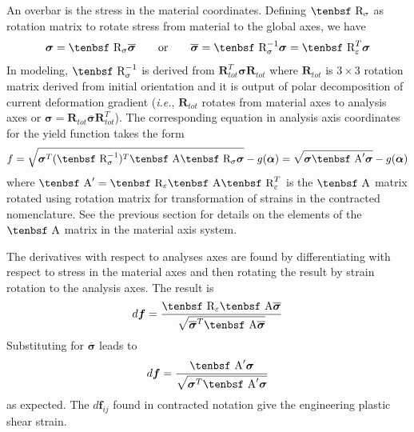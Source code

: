 \documentclass[11pt]{book}
\renewcommand{\vec}[1]{\boldsymbol{#1}}
\def\A{\hbox{\tenbsf A}}
\def\df{d \vec{f}}
\def\R{\hbox{\tenbsf R}}
\begin{document}
An overbar is the stress in the material coordinates. Defining $\R_\sigma$ as rotation matrix to rotate stress from material to the global axes, we have
\begin{equation}
     \vec\sigma = \R_\sigma\overline{\vec\sigma} \qquad{\rm or}\qquad \overline{\vec\sigma} =  \R_\sigma^{-1}\vec\sigma = \R_\varepsilon^T\vec\sigma
\end{equation}
In modeling, $\R_\sigma^{-1}$ is derived from $\vec R_{tot}^T\vec\sigma\vec R_{tot}$ where $\vec R_{tot}$ is $3\times3$ rotation matrix derived from initial orientation and it is output of polar decomposition of current deformation gradient (\emph{i.e.}, $\vec R_{tot}$ rotates from material axes to analysis axes or $\vec\sigma = \vec R_{tot}\overline{\vec\sigma}\vec R_{tot}^T$).
The corresponding equation in analysis axis coordinates for the yield function takes the form
\begin{equation}
     f = \sqrt{\vec\sigma^T (\R_\sigma^{-1})^T\A \R_\sigma\vec\sigma} - g(\vec\alpha) = \sqrt{\vec\sigma \A' \vec\sigma} - g(\vec\alpha)     \label{fanaleq}
\end{equation}
where $\A' = \R_\varepsilon\A\R_\varepsilon^T$ is the $\A$ matrix rotated using rotation matrix for transformation of strains in the contracted nomenclature. See the previous section for details on the elements of the $\A$ matrix in the material axis system.

The derivatives with respect to analyses axes are found by differentiating with respect to stress in the material axes and then rotating the result by strain rotation  to the analysis axes. The result is
\begin{equation}
         \df = {\R_\varepsilon\A \overline{\vec\sigma}\over\sqrt{\overline{\vec\sigma}^T\A \overline{\vec\sigma}}} \end{equation}
Substituting for $\overline{\vec\sigma}$ leads to
\begin{equation}
   \df = {\A' \vec\sigma\over\sqrt{\vec\sigma^T \A' \vec\sigma}} 
\end{equation}
as expected. The $\df_{ij}$ found in contracted notation give the engineering plastic shear strain.
\end{document}
